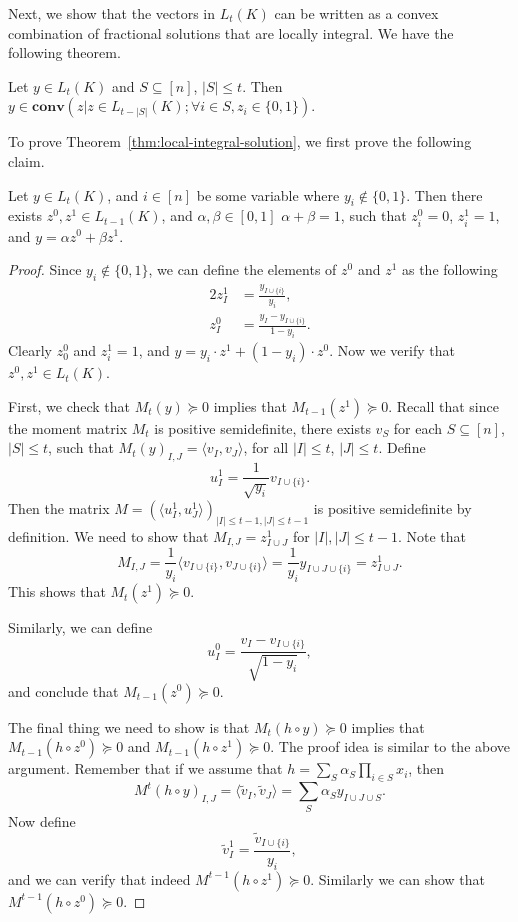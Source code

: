\documentclass[a4paper,twoside,justified]{tufte-handout}
\begin{document}
Next, we show that the vectors in $L_t(K)$ can be written as a convex
combination of fractional solutions that are locally integral. 
We have the following theorem.
\begin{theorem}\label{thm:local-integral-solution}
  Let $y \in L_t(K)$ and $S \subseteq [n]$, $|S| \le t$.
  Then $y \in \mathbf{conv}(z | z \in L_{t-|S|}(K); \forall i \in S, z_i \in \{0,1\})$.
\end{theorem}
To prove Theorem~\ref{thm:local-integral-solution}, we first prove the following claim.
\begin{claim}\label{claim:main-local-integral-claim}
  Let $y \in L_t(K)$, and $i \in [n]$ be some variable where $y_i \notin \{0,1\}$.
  Then there exists $z^0, z^1 \in L_{t-1}(K)$, and $\alpha, \beta \in [0,1]$
  $\alpha+\beta=1$, such that $z^0_i=0$, $z^1_i=1$, and $y=\alpha z^0 + \beta z^1$.
\end{claim}
\begin{proof}
  Since $y_i \notin \{0,1\}$, we can define the elements of $z^0$ and $z^1$ as
  the following
  \begin{alignat*}{2}
    z^1_I &= \frac{y_{I \cup \{i\}}}{y_i}, \\
    z^0_I &= \frac{y_I - y_{I \cup \{i\}}}{1-y_i}.
  \end{alignat*}
  Clearly $z^0_0$ and $z^1_i=1$, and $y=y_i \cdot z^1 + (1-y_i) \cdot z^0$.
  Now we verify that $z^0, z^1 \in L_t(K)$.

  First, we check that $M_t(y) \succeq 0$ implies that $M_{t-1}(z^1) \succeq 0$.
  Recall that since the moment matrix $M_t$ is positive semidefinite,
  there exists $v_S$ for each $S \subseteq [n]$, $|S| \le t$, 
  such that $M_t(y)_{I,J}=\langle v_I, v_J \rangle$, for all $|I| \le t$, $|J| \le t$.
  Define
  \[
  u^1_I = \frac{1}{\sqrt{y_i}} v_{I \cup \{i\}}.
  \]
  Then the matrix $M=(\langle u^1_I, u^1_J \rangle)_{|I| \le t-1, |J| \le t-1}$
  is positive semidefinite by definition. We need to show that $M_{I,J}=z^1_{I \cup J}$
  for $|I|,|J| \le t-1$. Note that
  \[
  M_{I,J} = \frac{1}{y_i} \langle v_{I \cup \{i\}}, v_{J \cup \{i\}} \rangle
  =\frac{1}{y_i} y_{I \cup J \cup \{i\}} = z^1_{I \cup J}.
  \]
  This shows that $M_t(z^1) \succeq 0$.

  Similarly, we can define
  \[
  u^0_I = \frac{v_I - v_{I \cup \{i\}}}{\sqrt{1-y_i}},
  \]
  and conclude that $M_{t-1}(z^0) \succeq 0$.

  The final thing we need to show is that $M_t(h \circ y) \succeq 0$
  implies that $M_{t-1}(h \circ z^0) \succeq 0$ and $M_{t-1}(h \circ z^1) \succeq 0$.
  The proof idea is similar to the above argument.
  Remember that if we assume that $h=\sum_S \alpha_S \prod_{i \in S} x_i$,
  then
  \[
  M^t(h \circ y)_{I,J} = \langle \tilde{v}_I, \tilde{v}_J \rangle 
  = \sum_S \alpha_S y_{I \cup J \cup S}.
  \]
  Now define 
  \[
  \tilde{v}^1_I = \frac{\tilde{v}_{I \cup \{i\}}}{y_i},
  \]
  and we can verify that indeed $M^{t-1}(h \circ z^1) \succeq 0$.
  Similarly we can show that $M^{t-1}(h \circ z^0) \succeq 0$.
\end{proof}
\end{document}

